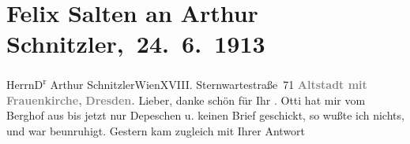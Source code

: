 

         
         \renewcommand{\erwaehntePersonen}{Personen: Lili Cappellini, Felix Salten, Ottilie Salten, Heinrich Schnitzler, Olga Schnitzler}
         \renewcommand{\erwaehnteOrte}{Orte: Berghof, Dresden, Frauenkirche, Sternwartestraße 71, Wien}
         \renewcommand{\erwaehnteWerke}{}
               \section[ Felix Salten an Arthur Schnitzler, 24. 6. 1913]{ Felix Salten an Arthur Schnitzler, 24. 6. 1913}\nopagebreak{}\rehead{ }\begin{ledgroupsized}[t]{13cm}\normalsize\beginnumbering{} \toendnotes[C]{\smallbreak\pagebreak[2]} 
\toendnotes[C]{\smallbreak}\pstart{}{\pb}Herrn\pend{}\pstart{}D\textsuperscript{r} Arthur Schnitzler\pend{}\pstart{}Wien\pend{}\pstart{}XVIII. Sternwartestraße 71\pend{}{\bigskip}\pstart
           \noindent{}\centering{}{\pb}\textcolor{gray}{\textbf{Altstadt mit Frauenkirche\textcolor{gray}{,}}}\pend
           \pstart
           \noindent{}\centering{}\textcolor{gray}{\textbf{Dresden.}}\pend
           \pstart{}{\pb}Lieber,\pend\pstart
           danke schön für Ihr \label{K_L03561-1v}\label{K_L03561-1h}. Otti hat mir vom Berghof
               aus bis jetzt nur Depeschen u. keinen Brief geschickt, so wußte ich nichts, und war
               beunruhigt. Gestern kam zugleich mit Ihrer Antwort

\end{ledgroupsized}
